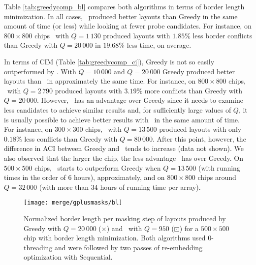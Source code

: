 Table \ref{tab:greedycomp_bl} compares both algorithms in terms of border length
minimization. In all cases, \Greedyplus\ produced better layouts than Greedy in
the same amount of time (or less) while looking at fewer probe candidates. For
instance, on $800\times 800$ chips \Greedyplus\ with $Q=1\,130$ produced layouts
with $1.85\%$ less border conflicts than Greedy with $Q=20\,000$ in $19.68\%$
less time, on average.

In terms of CIM (Table \ref{tab:greedycomp_ci}), Greedy is not so easily
outperformed by \Greedyplus. With $Q=10\,000$ and $Q=20\,000$ Greedy produced
better layouts than \Greedyplus\ in approximately the same time. For instance,
on $800\times 800$ chips, \Greedyplus\ with $Q=2\,790$ produced layouts with
$3.19\%$ more conflicts than Greedy with $Q=20\,000$. However, \Greedyplus\ has
an advantage over Greedy since it needs to examine less candidates to achieve
similar results and, for sufficiently large values of $Q$, it is usually
possible to achieve better results with \Greedyplus\ in the same amount of time.
For instance, on $300\times 300$ chips, \Greedyplus\ with $Q=13\,500$ produced
layouts with only $0.18\%$ less conflicts than Greedy with $Q=80\,000$. After
this point, however, the difference in ACI between Greedy and \Greedyplus\ tends
to increase (data not shown). We also observed that the larger the chip, the
less advantage \Greedyplus\ has over Greedy. On $500\times 500$ chips,
\Greedyplus\ starts to outperform Greedy when $Q=13\,500$ (with running times in
the order of 6 hours), approximately, and on $800\times 800$ chips around
$Q=32\,000$ (with more than 34 hours of running time per array).

\begin{figure}[t]\centering
\texttt{[image: merge/gplusmasks/bl]}
\caption{\label{fig:gplus_blm}%
  Normalized border length per masking step of layouts produced by Greedy with
  $Q=20\,000$ ({\tiny $\times$}) and \Greedyplus\ with $Q=950$
  ({\tiny $\boxdot$}) for a $500\times 500$ chip with border length
  minimization. Both algorithms used $0$-threading and were followed by two
  passes of re-embedding optimization with Sequential.}
\end{figure}

